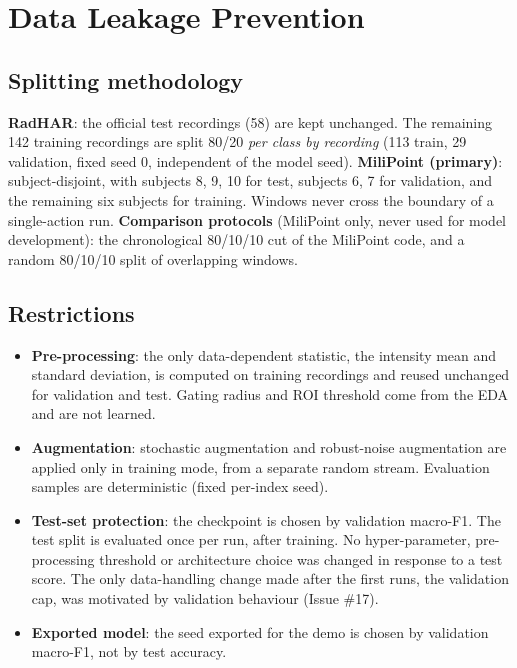 \chapter{Data Leakage Prevention}
\label{ch:leak}

\section{Splitting methodology}
\textbf{RadHAR}: the official test recordings (58) are kept unchanged. The
remaining 142 training recordings are split 80/20 \emph{per class by recording}
(113 train, 29 validation, fixed seed 0, independent of the model seed).
\textbf{MiliPoint (primary)}: subject-disjoint, with subjects 8, 9, 10 for test,
subjects 6, 7 for validation, and the remaining six subjects for training. Windows
never cross the boundary of a single-action run.
\textbf{Comparison protocols} (MiliPoint only, never used for model development):
the chronological 80/10/10 cut of the MiliPoint code, and a random 80/10/10
split of overlapping windows.

\section{Restrictions}
\begin{itemize}[nosep]
\item \textbf{Pre-processing}: the only data-dependent statistic, the intensity
  mean and standard deviation, is computed on training recordings and reused
  unchanged for validation and test. Gating radius and ROI threshold come from the
  EDA and are not learned.
\item \textbf{Augmentation}: stochastic augmentation and robust-noise
  augmentation are applied only in training mode, from a separate random stream.
  Evaluation samples are deterministic (fixed per-index seed).
\item \textbf{Test-set protection}: the checkpoint is chosen by validation
  macro-F1. The test split is evaluated once per run, after training. No
  hyper-parameter, pre-processing threshold or architecture choice was changed in
  response to a test score. The only data-handling change made after the first
  runs, the validation cap, was motivated by validation behaviour (Issue \#17).
\item \textbf{Exported model}: the seed exported for the demo is chosen by
  validation macro-F1, not by test accuracy.
\end{itemize}

